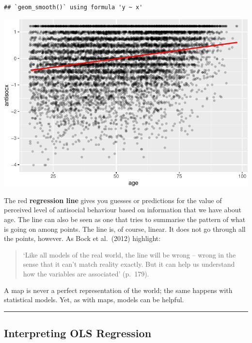 \documentclass[
]{book}
\begin{document}
\begin{verbatim}
## `geom_smooth()` using formula 'y ~ x'
\end{verbatim}

\includegraphics{09-regression_files/figure-latex/unnamed-chunk-9-1.pdf}

The red \textbf{regression line} gives you guesses or predictions for the value of perceived level of antisocial behaviour based on information that we have about age. The line can also be seen as one that tries to summarise the pattern of what is going on among points. The line is, of course, linear. It does not go through all the points, however.
As Bock et al.~(2012) highlight:

\begin{quote}
`Like all models of the real world, the line will be wrong -- wrong in the sense that it can't match reality exactly. But it can help us understand how the variables are associated' (p.~179).
\end{quote}

A map is never a perfect representation of the world; the same happens with statistical models. Yet, as with maps, models can be helpful.

\begin{center}\rule{0.5\linewidth}{0.5pt}\end{center}

\hypertarget{interpreting-ols-regression}{%
\subsection{Interpreting OLS Regression}\label{interpreting-ols-regression}}
\end{document}
